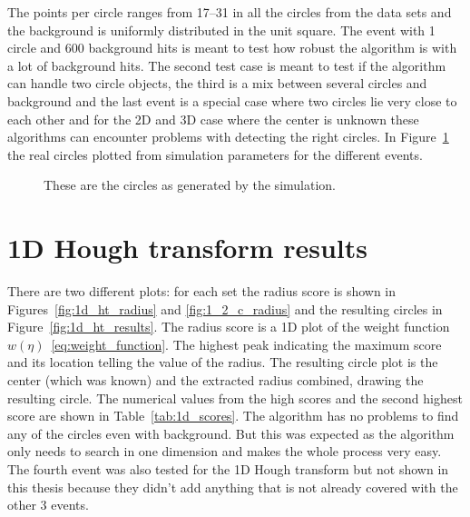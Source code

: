 \documentclass[11pt,twoside]{scrreprt}
\begin{document}
The points per circle ranges from 17--31 in all the circles from the data sets
and the background is uniformly distributed in the unit square. The event with 1
circle and 600 background hits is meant to test how robust the algorithm is with a 
lot of background hits. The second test case is meant to test if the algorithm can handle
two circle objects, the third is a mix between several circles and background and the last
event is a special case where two circles lie very close to each other and for the 2D
and 3D case where the center is unknown these algorithms can encounter problems with
detecting the right circles. In Figure~\ref{fig:real_ht_results}
the real circles plotted from simulation parameters for the different events.

\begin{figure}
\centering
                \label{fig:real_1c600bg}%
                \label{fig:real_2c0bg}

                \label{fig:real_5c30bg}%
                \label{fig:real_6c_200bg}%
        \caption{These are the circles as generated by the simulation.\label{fig:real_ht_results}}
\end{figure}

\section{1D Hough transform results} %
\label{sec:1d_hough_transform_results}

There are two different plots: for each set the radius score is shown in Figures~\ref{fig:1d_ht_radius} and \ref{fig:1_2_c_radius} and the resulting
circles in Figure~\ref{fig:1d_ht_results}. The radius score is a 1D plot of the weight function 
$w(\eta)$~\ref{eq:weight_function}. The highest peak indicating the maximum score and its location telling the value of the radius.
The resulting circle plot is the center (which was known) and the extracted radius combined, drawing the resulting circle. 
The numerical values from the high scores and the second highest score are shown in Table~\ref{tab:1d_scores}. 
The algorithm has no problems to find any of  the circles even with background. But this was expected as the 
algorithm only needs to search in one dimension and makes the whole process very easy. The fourth event was also tested for the 1D Hough
transform but not shown in this thesis because they didn't add anything that is not already covered with the other 3 events.
\end{document}
